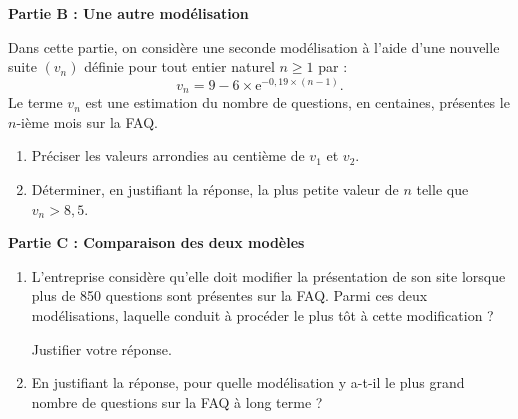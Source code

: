 \smallskip

\textbf{Partie B : Une autre modélisation}

\medskip

Dans cette partie, on considère une seconde modélisation à l’aide d’une nouvelle suite $\left(v_n\right)$ définie pour tout entier naturel $n \geqslant 1$ par :
%
\[ v_n = 9 - 6 \times \text{e}^{-0,19 \times (n-1)} .\]
%
Le terme $v_n$ est une estimation du nombre de questions, en centaines, présentes le $n$-ième mois sur la FAQ.

\begin{enumerate}
	\item Préciser les valeurs arrondies au centième de $v_1$ et $v_2$.
	\item Déterminer, en justifiant la réponse, la plus petite valeur de $n$ telle que $v_n > 8,5$.
\end{enumerate}

\smallskip

\textbf{Partie C : Comparaison des deux modèles}

\smallskip

\begin{enumerate}
	\item L’entreprise considère qu’elle doit modifier la présentation de son site lorsque plus de 850 questions sont présentes sur la FAQ. Parmi ces deux modélisations, laquelle conduit à procéder le plus tôt à cette modification ? 
	
	Justifier votre réponse. 
	\item En justifiant la réponse, pour quelle modélisation y a-t-il le plus grand nombre de questions sur la FAQ à long terme ? 
\end{enumerate}

